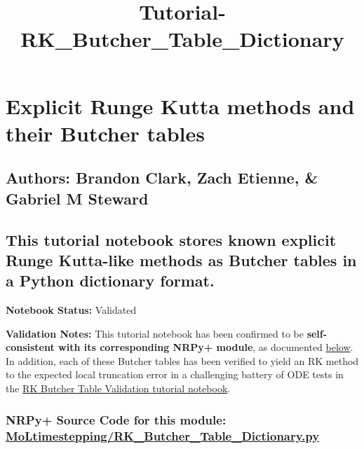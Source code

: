\documentclass[landscape,letterpaper,10pt,english]{article}
\title{Tutorial-RK\_Butcher\_Table\_Dictionary}
\begin{document}
    
    \maketitle
    
    

    
    \hypertarget{explicit-runge-kutta-methods-and-their-butcher-tables}{%
\section{Explicit Runge Kutta methods and their Butcher
tables}\label{explicit-runge-kutta-methods-and-their-butcher-tables}}

\hypertarget{authors-brandon-clark-zach-etienne-gabriel-m-steward}{%
\subsection{Authors: Brandon Clark, Zach Etienne, \& Gabriel M
Steward}\label{authors-brandon-clark-zach-etienne-gabriel-m-steward}}

\hypertarget{this-tutorial-notebook-stores-known-explicit-runge-kutta-like-methods-as-butcher-tables-in-a-python-dictionary-format.}{%
\subsection{This tutorial notebook stores known explicit Runge
Kutta-like methods as Butcher tables in a Python dictionary
format.}\label{this-tutorial-notebook-stores-known-explicit-runge-kutta-like-methods-as-butcher-tables-in-a-python-dictionary-format.}}

\textbf{Notebook Status:} Validated

\textbf{Validation Notes:} This tutorial notebook has been confirmed to
be \textbf{self-consistent with its corresponding NRPy+ module}, as
documented \hyperref[code_validation]{below}. In addition, each of these
Butcher tables has been verified to yield an RK method to the expected
local truncation error in a challenging battery of ODE tests in the
\href{Tutorial-RK_Butcher_Table_Validation.ipynb}{RK Butcher Table
Validation tutorial notebook}.

\hypertarget{nrpy-source-code-for-this-module-moltimesteppingrk_butcher_table_dictionary.py}{%
\subsubsection{\texorpdfstring{NRPy+ Source Code for this module:
\href{../edit/MoLtimestepping/RK_Butcher_Table_Dictionary.py}{MoLtimestepping/RK\_Butcher\_Table\_Dictionary.py}}{NRPy+ Source Code for this module: MoLtimestepping/RK\_Butcher\_Table\_Dictionary.py}}\label{nrpy-source-code-for-this-module-moltimesteppingrk_butcher_table_dictionary.py}}
\end{document}
